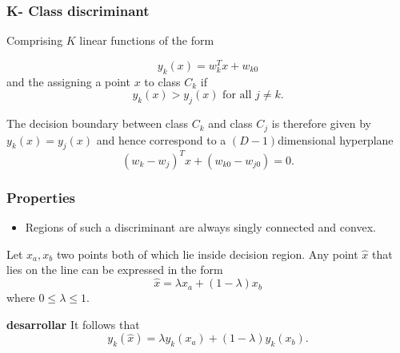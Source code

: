 \begin{frame}
    \frametitle{K- Class discriminant}
Comprising $K$ linear functions of the form 

\begin{equation}
    y_k(x) = w^T_k x + w_{k0}
\end{equation}
and the assigning a point $x$ to class $C_k$
if 
\begin{equation}
    y_k(x) > y_j(x) \text{ for all  } j \neq k.
\end{equation}

The decision boundary between class $C_k$ and class $C_j$ is therefore 
given by $y_k(x) = y_j(x)$ and hence 
correspond to a $(D-1)$dimensional hyperplane 
\begin{equation}
    (w_k - w_j)^T x 
    +
    (w_{k0} - w_{j0})
    = 
    0.
\end{equation}

\end{frame}

\begin{frame}
    \frametitle{Properties}
    \begin{itemize}
        \item Regions of such a discriminant are always singly connected and convex. 
    \end{itemize}
    Let $x_a, x_b$ two points both of which lie inside decision region. 
    Any point $\hat x$ that lies on the line 
can be expressed in the form 
\begin{equation}
    \hat x = 
    \lambda x_a +
    (1- \lambda) x_b
\end{equation}
where $0 \leq \lambda \leq 1.$ 

\textbf{desarrollar}
It follows that 
\begin{equation}
    y_k( \hat{x})
    = 
    \lambda y_k(x_a)
    +
    (1- \lambda) y_k(x_b). 
\end{equation}
\end{frame}



